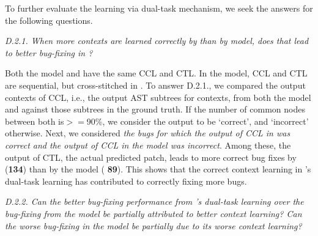To further evaluate the learning via dual-task
mechanism, we  seek the answers for the following questions.



{\em D.2.1. When more contexts are learned correctly by {\tool} than
  by  model, does that lead to better bug-fixing in
  {\tool}?}

Both the  model and {\tool} have the same CCL and
CTL. In the  model, CCL and CTL are sequential, but
cross-stitched in {\tool}. To answer D.2.1., we compared the output
contexts of CCL, i.e., the output AST subtrees for contexts, from both
the  model and {\tool} against those subtrees in the
ground truth. If the number of common nodes between both is$>=$90\%,
we consider the output to be `correct', and `incorrect'
otherwise. Next, we considered {\em the bugs for which the output of
  CCL in {\tool} was correct and the output of CCL in the
   model was incorrect}. Among these, the output
of CTL, the actual predicted patch, leads to more correct bug fixes
by {\tool} ({\bf 134}) than by the  model ({\bf
  89}). This shows that the correct context learning in {\tool}'s
dual-task learning has contributed to correctly fixing more bugs.


{\em D.2.2. Can the better bug-fixing performance from {\tool}'s
  dual-task learning over the bug-fixing from the 
  model be partially attributed to better context learning? Can the
  worse bug-fixing in the  model be partially due to
  its worse context learning?}


